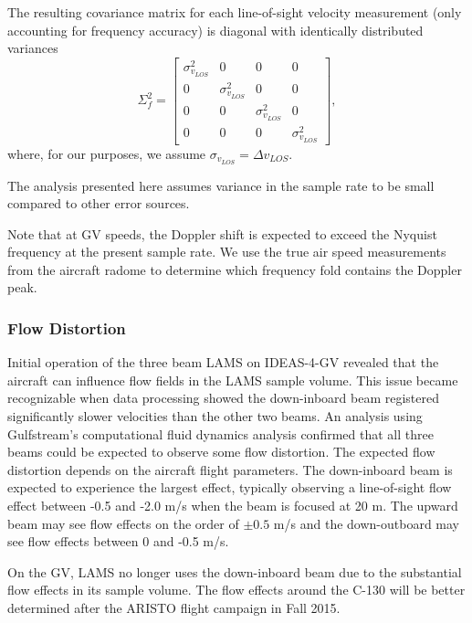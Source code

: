 \documentclass[12pt,twoside,english]{article}\usepackage[]{graphicx}\usepackage[]{color}
\let\OrgIndex\index
\renewcommand*{\index}[1]{\OrgIndex{#1}}
\begin{document}
The resulting covariance matrix for each line-of-sight velocity measurement (only accounting for frequency accuracy) is diagonal with identically distributed variances  
\begin{equation}
\Sigma_{f}^{2}=\left[\begin{array}{cccc} 
\sigma_{v_{LOS}}^{2} & 0 & 0 & 0\\ 0 & \sigma_{v_{LOS}}^{2} & 0 & 0\\ 0 & 0 & \sigma_{v_{LOS}}^{2} & 0\\ 0 & 0 & 0 & \sigma_{v_{LOS}}^{2} \end{array}\right],\label{CovFreq} 
\end{equation}
where, for our purposes, we assume $\sigma_{v_{LOS}}=\Delta v_{LOS}$. 

The analysis presented here assumes variance in the sample rate to be small compared to other error sources. 

Note that at GV speeds, the Doppler shift is expected to exceed the Nyquist frequency at the present sample rate. We use the true air speed measurements from the aircraft radome to determine which frequency fold contains the Doppler peak. 

\subsubsection{Flow Distortion}

Initial operation of the three beam  LAMS on IDEAS-4-GV revealed that the aircraft can influence flow fields in the LAMS sample volume. This issue became recognizable when data processing showed the down-inboard beam registered significantly slower velocities than the other two beams. An analysis using Gulfstream's computational fluid dynamics analysis confirmed that all three beams could be expected to observe some flow distortion. The expected flow distortion depends on the aircraft flight parameters. The down-inboard beam is expected to experience the largest effect, typically observing a line-of-sight flow effect between -0.5 and -2.0 m/s when the beam is focused at 20 m. The upward beam may see flow effects on the order of $\pm0.5$ m/s and the down-outboard may see flow effects between 0 and -0.5 m/s. 

On the GV, LAMS no longer uses the down-inboard beam due to the substantial flow effects in its sample volume. The flow effects around the C-130 will be better determined after the ARISTO flight campaign in Fall 2015. 
\end{document}
